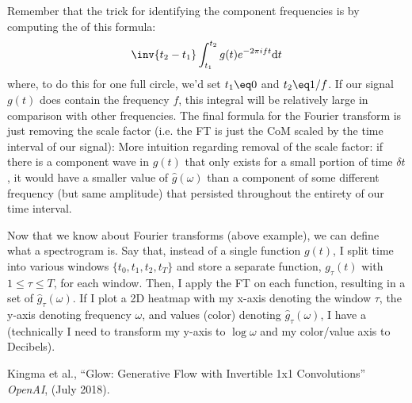 \documentclass[11pt]{article}
\begin{document}
\begin{example}
	
		Remember that the trick for identifying the component frequencies is by computing the  of this formula:
	\begin{align}
	\inv{t_2 - t_1} \int_{t_1}^{t_2} g(t) 	e^{-2\pi i f t} \mathrm{d} t
	\end{align}
	where, to do this for one full circle, we'd set $t_1 \eq 0$ and $t_2 \eq 1/f$. If our signal $g(t)$ does contain the frequency $f$, this integral will be relatively large in comparison with other frequencies. The final formula for the Fourier transform is just removing the scale factor (i.e. the FT is just the CoM scaled by the time interval of our signal):
	More intuition regarding removal of the scale factor: if there is a component wave in $g(t)$ that only exists for a small portion of time $\delta t$, it would have a smaller value of $\hat{g}(\omega)$ than a component of some different frequency (but same amplitude) that persisted throughout the entirety of our time interval.
\end{example}

\begin{example}
	Now that we know about Fourier transforms (above example), we can define what a spectrogram is. Say that, instead of a single function $g(t)$, I split time into various windows $\{t_0, t_1, t_2, t_T\}$ and store a separate function, $g_{\tau}(t)$ with $1 \le \tau \le T$, for each window. Then, I apply the FT on each function, resulting in a set of $\hat{g}_{\tau}(\omega)$. If I plot a 2D heatmap with my x-axis denoting the window $\tau$, the y-axis denoting frequency $\omega$, and values (color) denoting $\hat{g}_{\tau}(\omega)$, I have a  (technically I need to transform my y-axis to $\log \omega$ and my color/value axis to Decibels). 
\end{example}





\vspace{-1em}
{\footnotesize Kingma et al., ``Glow: Generative Flow with Invertible 1x1 Convolutions'' \textit{OpenAI}, (July 2018).}

\newcommand\pt{p_{\theta}}
\end{document}
